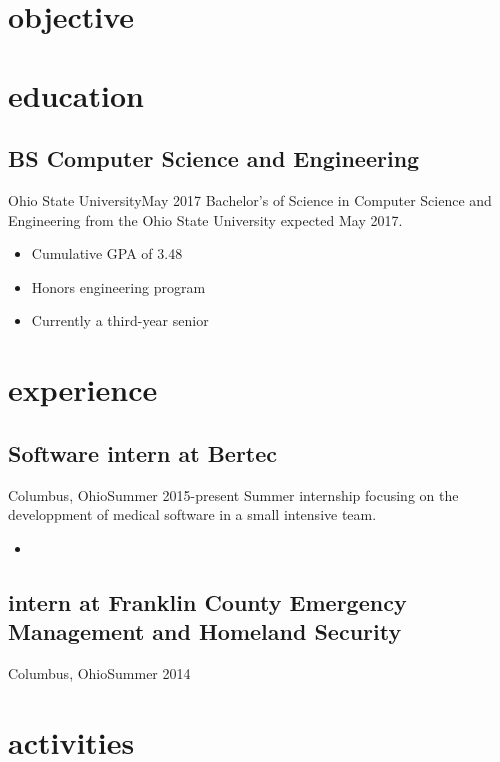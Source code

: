\documentclass[12pt,letterpaper]{cv}
\begin{document}
	\author{Brandon A. Moore}
	\maketitle
	
	\section{objective}
		
	\section{education}
		\subsection{BS Computer Science and Engineering}{Ohio State University}{May 2017}
			Bachelor's of Science in Computer Science and Engineering from the Ohio State University expected May 2017.
			\begin{itemize}
				\item Cumulative GPA of 3.48
				\item Honors engineering program
				\item Currently a third-year senior
			\end{itemize}

	\section{experience}
		\subsection{Software intern at Bertec}{Columbus, Ohio}{Summer 2015-present}
			Summer internship focusing on the developpment of medical software in a small intensive team.
			\begin{itemize}
				\item 
			\end{itemize}
	
		\subsection{intern at Franklin County Emergency Management and Homeland Security}{Columbus, Ohio}{Summer 2014}

	\section{activities}
\end{document}

